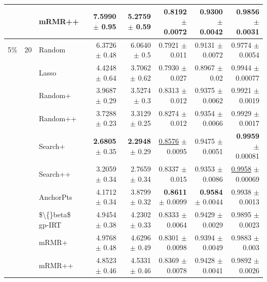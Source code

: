 \begin{longtable}{llp{}rrrrr}
 &  & mRMR++ & 7.5990 {\scriptsize $\pm$ 0.95} & 5.2759 {\scriptsize $\pm$ 0.59} & 0.8192 {\scriptsize $\pm$ 0.0072} & 0.9300 {\scriptsize $\pm$ 0.0042} & 0.9856 {\scriptsize $\pm$ 0.0031} \\
\midrule
5\% & 20 & Random & 6.3726 {\scriptsize $\pm$ 0.48} & 6.0640 {\scriptsize $\pm$ 0.5} & 0.7921 {\scriptsize $\pm$ 0.011} & 0.9131 {\scriptsize $\pm$ 0.0072} & 0.9774 {\scriptsize $\pm$ 0.0054} \\
 &  & Lasso & 4.4248 {\scriptsize $\pm$ 0.64} & 3.7062 {\scriptsize $\pm$ 0.62} & 0.7930 {\scriptsize $\pm$ 0.027} & 0.8967 {\scriptsize $\pm$ 0.02} & 0.9944 {\scriptsize $\pm$ 0.00077} \\
 &  & Random+ & 3.9687 {\scriptsize $\pm$ 0.29} & 3.5274 {\scriptsize $\pm$ 0.3} & 0.8313 {\scriptsize $\pm$ 0.012} & 0.9375 {\scriptsize $\pm$ 0.0062} & 0.9921 {\scriptsize $\pm$ 0.0019} \\
 &  & Random++ & 3.7288 {\scriptsize $\pm$ 0.23} & 3.3129 {\scriptsize $\pm$ 0.25} & 0.8274 {\scriptsize $\pm$ 0.012} & 0.9354 {\scriptsize $\pm$ 0.0066} & 0.9929 {\scriptsize $\pm$ 0.0017} \\
 &  & Search+ & \textbf{2.6805} {\scriptsize $\pm$ 0.35} & \textbf{2.2948} {\scriptsize $\pm$ 0.29} & \underline{0.8576} {\scriptsize $\pm$ 0.0095} & 0.9475 {\scriptsize $\pm$ 0.0051} & \textbf{0.9959} {\scriptsize $\pm$ 0.00081} \\
 &  & Search++ & 3.2059 {\scriptsize $\pm$ 0.34} & 2.7659 {\scriptsize $\pm$ 0.34} & 0.8337 {\scriptsize $\pm$ 0.015} & 0.9353 {\scriptsize $\pm$ 0.0086} & \underline{0.9958} {\scriptsize $\pm$ 0.00069} \\
 &  & AnchorPts & 4.1712 {\scriptsize $\pm$ 0.34} & 3.8799 {\scriptsize $\pm$ 0.32} & \textbf{0.8611} {\scriptsize $\pm$ 0.0099} & \textbf{0.9584} {\scriptsize $\pm$ 0.0044} & 0.9938 {\scriptsize $\pm$ 0.0013} \\
 &  & \$\textbackslash\{\}beta\$ gp-IRT & 4.9454 {\scriptsize $\pm$ 0.38} & 4.2302 {\scriptsize $\pm$ 0.33} & 0.8333 {\scriptsize $\pm$ 0.0064} & 0.9429 {\scriptsize $\pm$ 0.0029} & 0.9895 {\scriptsize $\pm$ 0.0023} \\
 &  & mRMR+ & 4.9768 {\scriptsize $\pm$ 0.48} & 4.6296 {\scriptsize $\pm$ 0.49} & 0.8301 {\scriptsize $\pm$ 0.0098} & 0.9394 {\scriptsize $\pm$ 0.0049} & 0.9883 {\scriptsize $\pm$ 0.003} \\
 &  & mRMR++ & 4.8523 {\scriptsize $\pm$ 0.46} & 4.5331 {\scriptsize $\pm$ 0.46} & 0.8369 {\scriptsize $\pm$ 0.0078} & 0.9428 {\scriptsize $\pm$ 0.0041} & 0.9892 {\scriptsize $\pm$ 0.0026} \\

\end{longtable}
